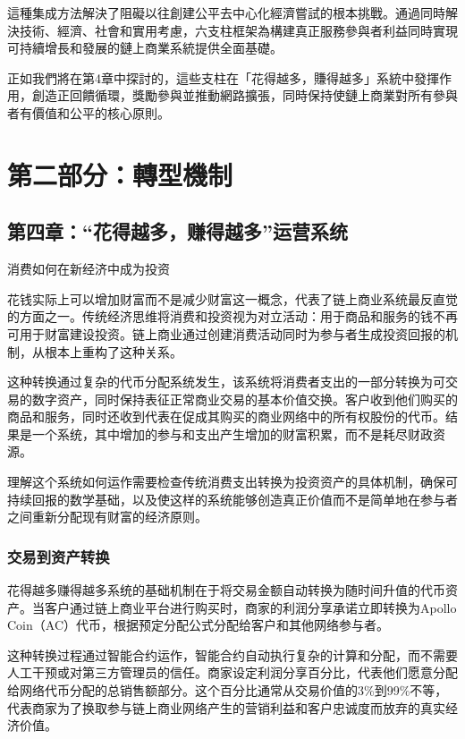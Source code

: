 \documentclass[
  Letterpaper,
]{scrbook}
\begin{document}
這種集成方法解決了阻礙以往創建公平去中心化經濟嘗試的根本挑戰。通過同時解決技術、經濟、社會和實用考慮，六支柱框架為構建真正服務參與者利益同時實現可持續增長和發展的鏈上商業系統提供全面基礎。

正如我們將在第4章中探討的，這些支柱在「花得越多，賺得越多」系統中發揮作用，創造正回饋循環，獎勵參與並推動網路擴張，同時保持使鏈上商業對所有參與者有價值和公平的核心原則。

\part{第二部分：轉型機制}

\chapter{第四章：``花得越多，赚得越多''运营系统}\label{sec-spend-earn-system}

消费如何在新经济中成为投资

花钱实际上可以增加财富而不是减少财富这一概念，代表了链上商业系统最反直觉的方面之一。传统经济思维将消费和投资视为对立活动：用于商品和服务的钱不再可用于财富建设投资。链上商业通过创建消费活动同时为参与者生成投资回报的机制，从根本上重构了这种关系。

这种转换通过复杂的代币分配系统发生，该系统将消费者支出的一部分转换为可交易的数字资产，同时保持表征正常商业交易的基本价值交换。客户收到他们购买的商品和服务，同时还收到代表在促成其购买的商业网络中的所有权股份的代币。结果是一个系统，其中增加的参与和支出产生增加的财富积累，而不是耗尽财政资源。

理解这个系统如何运作需要检查传统消费支出转换为投资资产的具体机制，确保可持续回报的数学基础，以及使这样的系统能够创造真正价值而不是简单地在参与者之间重新分配现有财富的经济原则。

\section{交易到资产转换}\label{ux4ea4ux6613ux5230ux8d44ux4ea7ux8f6cux6362}

花得越多赚得越多系统的基础机制在于将交易金额自动转换为随时间升值的代币资产。当客户通过链上商业平台进行购买时，商家的利润分享承诺立即转换为Apollo
Coin（AC）代币，根据预定分配公式分配给客户和其他网络参与者。

这种转换过程通过智能合约运作，智能合约自动执行复杂的计算和分配，而不需要人工干预或对第三方管理员的信任。商家设定利润分享百分比，代表他们愿意分配给网络代币分配的总销售额部分。这个百分比通常从交易价值的3\%到99\%不等，代表商家为了换取参与链上商业网络产生的营销利益和客户忠诚度而放弃的真实经济价值。
\end{document}
